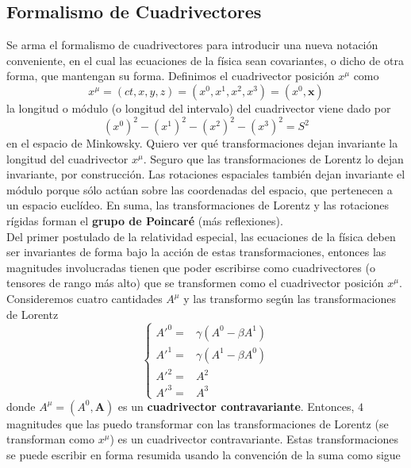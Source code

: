 \subsection{Formalismo de Cuadrivectores}
Se arma el formalismo de cuadrivectores para introducir una nueva notación conveniente, en el cual las ecuaciones de la física sean covariantes, o dicho de otra forma, que mantengan su forma.
Definimos el cuadrivector posición $x^{\mu}$ como 
\begin{equation*}
    x^{\mu} = (ct, x, y, z) = (x^{0}, x^{1}, x^{2}, x^{3}) = (x^{0},\textbf{x})
\end{equation*}
la longitud o módulo (o longitud del intervalo) del cuadrivector viene dado por
\begin{equation*}
    (x^{0})^{2} - (x^{1})^{2} - (x^{2})^{2} - (x^{3})^{2} = S^{2}
\end{equation*}
en el espacio de Minkowsky. Quiero ver qué transformaciones dejan invariante la longitud del cuadrivector $x^{\mu}$. Seguro que las transformaciones de Lorentz lo dejan invariante, por construcción. Las rotaciones espaciales también dejan invariante el módulo porque sólo actúan sobre las coordenadas del espacio, que pertenecen a un espacio euclídeo. En suma, las transformaciones de Lorentz y las rotaciones rígidas forman el \textbf{grupo de Poincaré} (más reflexiones).\\
\indent Del primer postulado de la relatividad especial, las ecuaciones de la física deben ser invariantes de forma bajo la acción de estas transformaciones, entonces las magnitudes involucradas tienen que poder escribirse como cuadrivectores (o tensores de rango más alto) que se transformen como el cuadrivector posición $x^{\mu}$.\\
\indent Consideremos cuatro cantidades $A^{\mu}$ y las transformo según las transformaciones de Lorentz
\begin{equation*}
    \left\{
        \begin{array}{ll}
             A'^{0} = & \gamma(A^{0} - \beta A^{1}) \\
             A'^{1} = & \gamma(A^{1} - \beta A^{0}) \\
             A'^{2} = & A^{2}\\
             A'^{3} = & A^{3}
        \end{array}
    \right.
\end{equation*}
donde $A^{\mu} = (A^{0}, \textbf{A})$ es un \textbf{cuadrivector contravariante}. Entonces, $4$ magnitudes que las puedo transformar con las transformaciones de Lorentz (se transforman como $x^{\mu}$) es un cuadrivector contravariante. Estas transformaciones se puede escribir en forma resumida usando la convención de la suma como sigue
